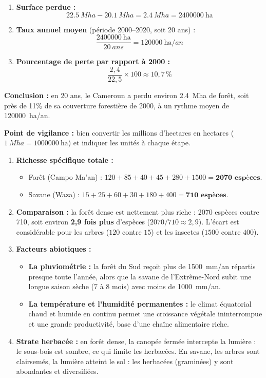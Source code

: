 \documentclass[11pt]{article}
\begin{document}
\begin{corrige}
\begin{enumerate}
    \item \textbf{Surface perdue :}
    \[ \SI{22,5}{Mha} - \SI{20,1}{Mha} = \SI{2,4}{Mha} = \SI{2400000}{\hectare} \]
    \item \textbf{Taux annuel moyen} (période 2000--2020, soit 20 ans) :
    \[ \frac{\SI{2400000}{\hectare}}{\SI{20}{ans}} = \SI{120000}{\hectare/an} \]
    \item \textbf{Pourcentage de perte par rapport à 2000 :}
    \[ \frac{2,4}{22,5} \times 100 \approx 10,7\,\% \]
\end{enumerate}
\textbf{Conclusion :} en 20 ans, le Cameroun a perdu environ \SI{2,4}{Mha} de forêt, soit près de \num{11}\% de sa couverture forestière de 2000, à un rythme moyen de \SI{120000}{\hectare/an}.

\textbf{Point de vigilance :} bien convertir les millions d'hectares en hectares ($\SI{1}{Mha} = \SI{1000000}{\hectare}$) et indiquer les unités à chaque étape.
\end{corrige}

\begin{corrige}
\begin{enumerate}
    \item \textbf{Richesse spécifique totale :}
    \begin{itemize}
        \item Forêt (Campo Ma'an) : $120 + 85 + 40 + 45 + 280 + 1500 = \textbf{2070 espèces}$.
        \item Savane (Waza) : $15 + 25 + 60 + 30 + 180 + 400 = \textbf{710 espèces}$.
    \end{itemize}
    \item \textbf{Comparaison :} la forêt dense est nettement plus riche : \num{2070} espèces contre \num{710}, soit environ \textbf{2,9 fois plus} d'espèces ($2070/710 \approx 2,9$). L'écart est considérable pour les arbres ($120$ contre $15$) et les insectes ($1500$ contre $400$).
    \item \textbf{Facteurs abiotiques :}
    \begin{itemize}
        \item \textbf{La pluviométrie :} la forêt du Sud reçoit plus de \SI{1500}{mm/an} répartis presque toute l'année, alors que la savane de l'Extrême-Nord subit une longue saison sèche (7 à 8 mois) avec moins de \SI{1000}{mm/an}.
        \item \textbf{La température et l'humidité permanentes :} le climat équatorial chaud et humide en continu permet une croissance végétale ininterrompue et une grande productivité, base d'une chaîne alimentaire riche.
    \end{itemize}
    \item \textbf{Strate herbacée :} en forêt dense, la canopée fermée intercepte la lumière : le sous-bois est sombre, ce qui limite les herbacées. En savane, les arbres sont clairsemés, la lumière atteint le sol : les herbacées (graminées) y sont abondantes et diversifiées.
\end{enumerate}
\end{corrige}
\end{document}
